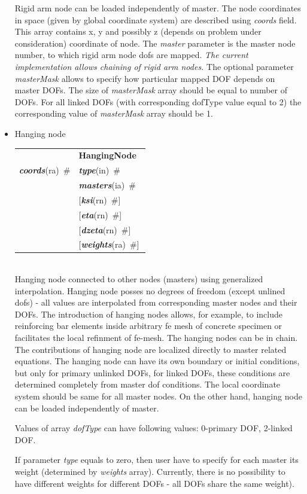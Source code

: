 \documentclass[a4paper]{article}
\makeatletter
\newcommand{\param}[1]{{\em #1}}
\newcommand{\keywordnotype}[1]{\mbox{{\it{\bf{#1}}}}}
\newcommand{\keyword}[2]{\mbox{{\keywordnotype{#1}\tiny (#2)}}}
\newcommand{\entKeywordInst}[1]{\mbox{{\bf{{#1}}}}}
\newcommand{\field}[2]{\mbox{\keyword{#1}{#2}~\#}}
\newcommand{\optField}[2]{\mbox{[\field{#1}{#2}]}}
\newenvironment{record}[1][]{\begin{tabular}{|ll}}{\end{tabular}\\}
\newcommand{\recentry}[2]{{#1}&{#2}\\}
\newcounter{rcc}
\newenvironment{record}[1][\textwidth]{\setcounter{rcc}{0}\begin{tabular*}{#1}{|ll@{\extracolsep{\fill}}r}}{\end{tabular*}\\}
\newcommand{\recentry}[2]{\ifthenelse{\value{rcc}>0}{&$\backslash$ \\}{\setcounter{rcc}{1}}{#1}&{#2}}
\makeatother
\begin{document}
\begin{itemize}
Rigid arm node can be loaded
independently of master. The node coordinates in space (given by
global coordinate system) are described using \param{coords}
field. This array contains x, y and possibly z (depends on problem
under consideration) coordinate of node. The \param{master} parameter is the
master node number, to which rigid arm node dofs are mapped.
{\em The current implementation allows chaining of rigid arm nodes.}
The optional parameter \param{masterMask} allows to specify how
particular mapped DOF depends on master DOFs. The size of \param{masterMask} array
should be equal to number of DOFs. For all linked DOFs (with
corresponding dofType value equal to 2) the corresponding value of
\param{masterMask} array should be 1.

\item Hanging node

  \begin{record}[0.9\textwidth]
    \recentry{}{\entKeywordInst{HangingNode~}}{\field{coords}{ra}}
    \recentry{}{\field{type}{in}} \recentry{}{\field{masters}{ia}}
    \recentry{}{\optField{ksi}{rn}}
    \recentry{}{\optField{eta}{rn}} \recentry{}{\optField{dzeta}{rn}} \recentry{}{\optField{weights}{ra}}
  \end{record}
  Hanging node connected to other nodes (masters) using generalized interpolation.
Hanging node posses no degrees of freedom	(except unlined dofs) - all values are
interpolated from corresponding master nodes and their DOFs.
The introduction of hanging nodes allows, for example, to include reinforcing bar elements inside
arbitrary fe mesh of concrete specimen or facilitates the local
refinment of fe-mesh. The hanging nodes can be in chain.
The contributions of hanging node are localized directly to master related equations.
The hanging node can have its own boundary or initial conditions, but
only for primary unlinked DOFs, for linked DOFs, these conditions are
determined completely from master dof conditions.
The local coordinate system should be same for all master nodes.
On the other hand, hanging node can be loaded independently of
master.

Values of array \param{dofType} can have following values: {0-primary
 DOF, 2-linked DOF}.

If parameter \param{type} equals to zero, then user have to specify
for each master its weight (determined by \param{weights} array).
Currently, there is no possibility to have different weights for
different DOFs - all DOFs share the same weight).


\end{itemize}
\end{document}
